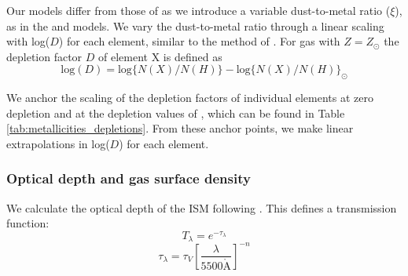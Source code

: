 \documentclass[fleqn,usenatbib]{mnras}
\begin{document}
Our models differ from those of \cite{byler2017} as we introduce a variable dust-to-metal ratio ($\xi$), as in the \cite{charlot2001} and \cite{brinchmann2013} models. We vary the dust-to-metal ratio through a linear scaling with log($D$) for each element,  similar to the method of \cite{jenkins2009}. For gas with $Z = Z_{\odot}$  the depletion factor $D$ of element X is defined as 
\begin{equation}
    \textrm{log}(D)=\textrm{log}\{N(X)/N(H)\} - \textrm{log}\{N(X)/N(H)\}_{\odot} 
\end{equation}

We anchor the scaling of the depletion factors of individual elements at zero depletion and at the depletion values of \cite{dopita2013}, which can be found in Table \ref{tab:metallicities_depletions}. From these anchor points, we make linear extrapolations in log($D$) for each element. 

\subsubsection{Optical depth and gas surface density}
We calculate the optical depth of the ISM following \cite{charlot2000}. This defines a transmission function:
\begin{equation}
\label{CH2000_transmission}
    T_{\lambda} = e^{-\tau_{\lambda}}
\end{equation}
\begin{equation}
\label{dust_attenuation}
    \tau_{\lambda} = \tau_{V} \left[ \frac{\lambda}{5500 
\mathring{\mathrm{A}}} \right]^{-n}
\end{equation}
\end{document}
